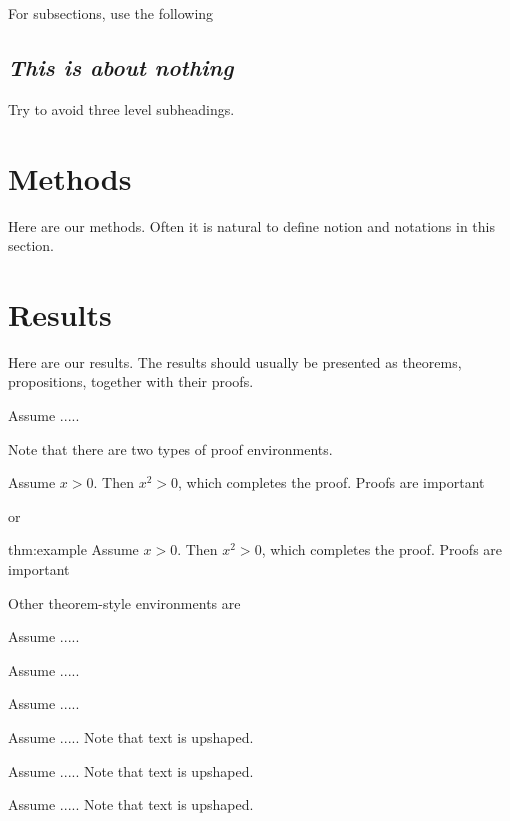 \documentclass[a4paper,fleqn]{cas-sc} %
\begin{document}
\medskip
For subsections, use the following
\subsection*{ {\sl This is about nothing}}

\noindent\medskip
Try to avoid three level subheadings.

\section{Methods\label{sec:2}}

Here are our methods. Often it is natural to define notion and notations in this section.

\section{Results\label{sec:3}}

Here are our results. The results should usually be presented as theorems, propositions, together with their proofs.

\begin{theorem}\label{thm:example} Assume .....
\end{theorem}

Note that there are two types of proof environments.

\begin{Proof}
Assume \( x > 0 \). Then \( x^2 > 0 \), which completes the proof. Proofs are important
\end{Proof}

or
\begin{Proofx}{thm:example}%
Assume \( x > 0 \). Then \( x^2 > 0 \), which completes the proof. Proofs are important
\end{Proofx}

\medskip
Other theorem-style environments are
\begin{proposition} Assume .....
\end{proposition}
\begin{lemma} Assume .....
\end{lemma}
\begin{corollary} Assume .....
\end{corollary}

\smallskip
\begin{definition}Assume ..... Note that text is upshaped.
\end{definition}
\begin{remark} Assume ..... Note that text is upshaped.
\end{remark}
\begin{example} Assume .....  Note that text is upshaped.
\end{example}
\end{document}
